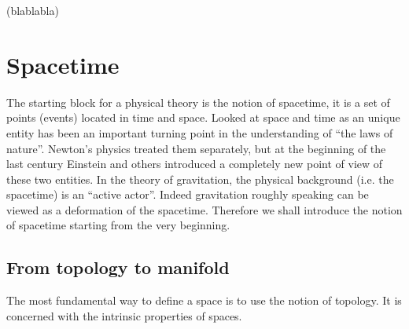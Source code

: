 \documentclass[12pt]{book}
\theoremstyle{break}
\begin{document}






(blablabla)




\chapter{Spacetime}\label{p:SPACETIME}


The starting block for a physical theory is the notion of spacetime, it is a set of points (events) located in time and space. Looked at space and time as an unique entity has been an important turning point in the understanding of ``the laws of nature''. Newton's physics treated them separately, but at the beginning of the last century Einstein and others introduced a completely new point of view of these two entities. In the theory of gravitation, the physical background (i.e. the spacetime) is an ``active actor''. Indeed gravitation roughly speaking can be viewed as a deformation of the spacetime. Therefore we shall introduce the notion of spacetime starting from the very beginning.


\section{From topology to manifold}


The most fundamental way to define a space is to use the notion of topology. It is concerned with the intrinsic properties of spaces.
\end{document}
